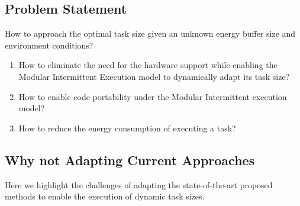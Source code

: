 \documentclass[sigconf,anonymous,review]{acmart}
\begin{document}






\subsection{Problem Statement}
How to approach the optimal task size given an unknown energy buffer size and environment conditions? 
	 \begin{enumerate}
		 \item How to eliminate the need for the hardware support while enabling the Modular Intermittent Execution model to dynamically adapt its task size?
		 \item How to enable code portability under the Modular Intermittent execution model? 
		 \item How to reduce the energy consumption of executing a task? 
	\end{enumerate}

\subsection{Why not Adapting Current Approaches}
Here we highlight the challenges of adapting the state-of-the-art proposed methods to enable the execution of dynamic task sizes. 
%
\end{document}
